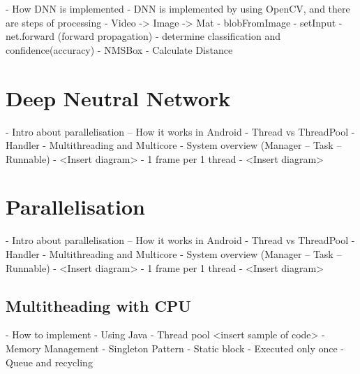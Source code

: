         -	How DNN is implemented
            - DNN is implemented by using OpenCV, and there are steps of processing
                - Video -> Image -> Mat
                - blobFromImage
                - setInput
                - net.forward (forward propagation)
                - determine classification and confidence(accuracy)
                - NMSBox
                - Calculate Distance

    \section{Deep Neutral Network}
        -	Intro about parallelisation – How it works in Android
            - Thread vs ThreadPool
            - Handler
        -	Multithreading and Multicore
        -	System overview (Manager – Task – Runnable)
            - <Insert diagram>
        -	1 frame per 1 thread
            - <Insert diagram>

    \section{Parallelisation}
        -	Intro about parallelisation – How it works in Android
            - Thread vs ThreadPool
            - Handler
        -	Multithreading and Multicore
        -	System overview (Manager – Task – Runnable)
            - <Insert diagram>
        -	1 frame per 1 thread
            - <Insert diagram>

        \subsection{Multitheading with CPU}
            -	How to implement
                - Using Java
                - Thread pool
                    <insert sample of code>
            -	Memory Management
                - Singleton Pattern
                - Static block
                    - Executed only once
                - Queue and recycling

